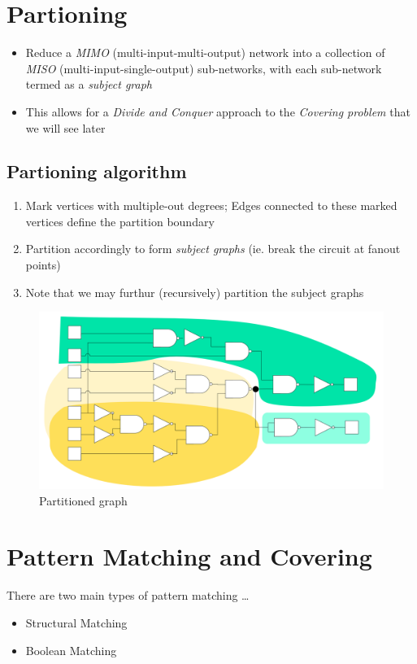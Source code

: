 \documentclass{article}
\begin{document}
\section{Partioning}
\begin{itemize}
    \item Reduce a \textit{MIMO} (multi-input-multi-output) network into a collection of \textit{MISO} (multi-input-single-output) sub-networks,
            with each sub-network termed as a \textit{subject graph}
    \item This allows for a \textit{Divide and Conquer} approach to the \textit{Covering problem} that we will see later
\end{itemize}

\subsection{Partioning algorithm}
\begin{enumerate}
    \item Mark vertices with multiple-out degrees; Edges connected to these marked vertices define the partition boundary
    \item Partition accordingly to form \textit{subject graphs} (ie. break the circuit at fanout points)
    \item Note that we may furthur (recursively) partition the subject graphs
\end{enumerate}

\begin{figure}[htp]
    \centering
    \includegraphics[width=12cm, scale=1]{S3/partitionedGraph.PNG}
    \caption{Partitioned graph}
\end{figure}

\section{Pattern Matching and Covering}
There are two main types of pattern matching \dots
\begin{itemize}
    \item Structural Matching
    \item Boolean Matching
\end{itemize}
\end{document}

